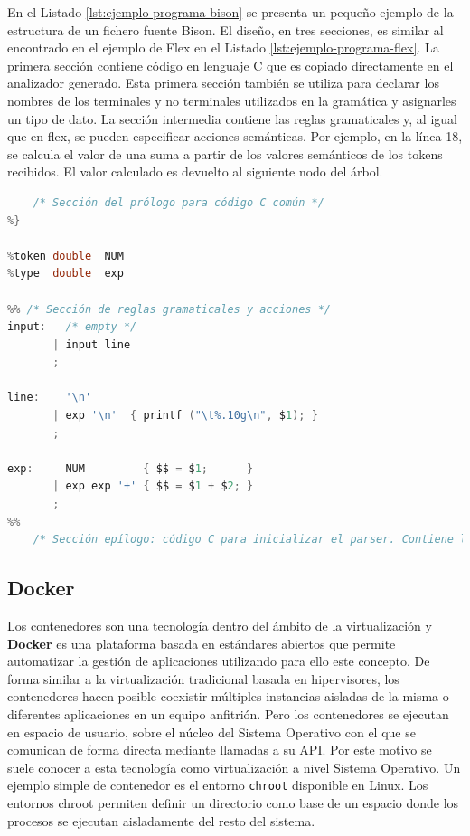 En el Listado \ref{lst:ejemplo-programa-bison} se presenta un pequeño ejemplo de la estructura de un fichero fuente Bison. El diseño, en tres secciones, es similar al encontrado en el ejemplo de Flex en el Listado \ref{lst:ejemplo-programa-flex}. La primera sección contiene código en lenguaje C que es copiado directamente en el analizador generado. Esta primera sección también se utiliza para declarar los nombres de los terminales y no terminales utilizados en la gramática y asignarles un tipo de dato. La sección intermedia contiene las reglas gramaticales y, al igual que en flex, se pueden especificar acciones semánticas. Por ejemplo, en la línea 18, se calcula el valor de una suma a partir de los valores semánticos de los tokens recibidos. El valor calculado es devuelto al siguiente nodo del árbol.

\begin{lstlisting}[language=C,caption={Ejemplo de programa Bison \cite{mit_web_bisonExample}},label=lst:ejemplo-programa-bison]
%{
    /* Sección del prólogo para código C común */
%}

%token double  NUM
%type  double  exp

%% /* Sección de reglas gramaticales y acciones */
input:   /* empty */
       | input line
       ;

line:    '\n'
       | exp '\n'  { printf ("\t%.10g\n", $1); }
       ;
    
exp:     NUM         { $$ = $1;      }
       | exp exp '+' { $$ = $1 + $2; }
       ;
%%
    /* Sección epílogo: código C para inicializar el parser. Contiene la función main() */
\end{lstlisting}

\subsection{Docker}

Los contenedores son una tecnología dentro del ámbito de la virtualización y \textbf{Docker} es una plataforma basada en estándares abiertos que permite automatizar la gestión de aplicaciones utilizando para ello este concepto. De forma similar a la virtualización tradicional basada en \gls{hipervisores}, los contenedores hacen posible coexistir múltiples instancias aisladas de la misma o diferentes aplicaciones en un  equipo anfitrión. Pero los contenedores se ejecutan en espacio de usuario, sobre el núcleo del Sistema Operativo con el que se comunican de forma directa mediante llamadas a su API. Por este motivo se suele conocer a esta tecnología como virtualización a nivel Sistema Operativo. Un ejemplo simple de contenedor es el entorno \verb|chroot| disponible en Linux. Los entornos chroot permiten definir un directorio como base de un espacio donde los procesos se ejecutan aisladamente del resto del sistema. 

